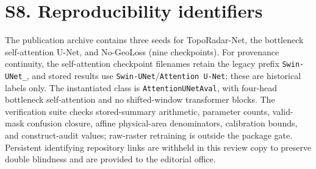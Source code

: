 \documentclass[11pt,a4paper]{article}
\begin{document}
\section*{S8. Reproducibility identifiers}

The publication archive contains three seeds for TopoRadar-Net, the bottleneck self-attention U-Net, and No-GeoLoss (nine checkpoints). For provenance continuity, the self-attention checkpoint filenames retain the legacy prefix \texttt{Swin-UNet\_}, and stored results use \texttt{Swin-UNet}/\texttt{Attention U-Net}; these are historical labels only. The instantiated class is \texttt{AttentionUNetAval}, with four-head bottleneck self-attention and no shifted-window transformer blocks. The verification suite checks stored-summary arithmetic, parameter counts, valid-mask confusion closure, affine physical-area denominators, calibration bounds, and construct-audit values; raw-raster retraining is outside the package gate. Persistent identifying repository links are withheld in this review copy to preserve double blindness and are provided to the editorial office.
\end{document}
